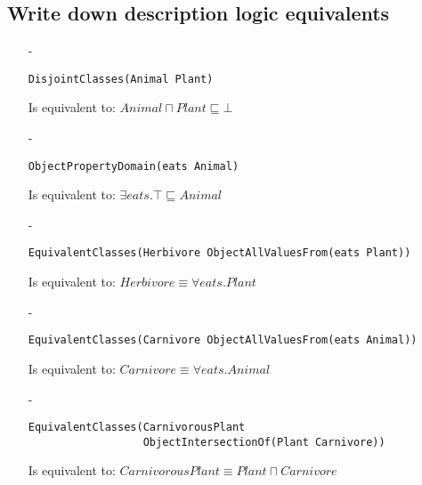 \documentclass[a4paper,12pt]{article}
\begin{document}
\subsection[DL equivalents]{Write down description logic equivalents}
\begin{itemize}
\item[-]\begin{Verbatim}[samepage=true]
DisjointClasses(Animal Plant)
\end{Verbatim}
Is equivalent to: $ Animal \sqcap Plant \sqsubseteq \bot $

\item[-]\begin{Verbatim}[samepage=true]
ObjectPropertyDomain(eats Animal)
\end{Verbatim}
Is equivalent to: $ \exists eats.\top \sqsubseteq Animal $

\item[-]\begin{Verbatim}[samepage=true]
EquivalentClasses(Herbivore ObjectAllValuesFrom(eats Plant))
\end{Verbatim}
Is equivalent to: $ Herbivore \equiv \forall eats.Plant $

\item[-]\begin{Verbatim}[samepage=true]
EquivalentClasses(Carnivore ObjectAllValuesFrom(eats Animal))
\end{Verbatim}
Is equivalent to: $ Carnivore \equiv \forall eats.Animal $

\item[-]\begin{Verbatim}[samepage=true]
EquivalentClasses(CarnivorousPlant 
                  ObjectIntersectionOf(Plant Carnivore))
\end{Verbatim}
Is equivalent to: $ CarnivorousPlant \equiv Plant \sqcap Carnivore $
\end{itemize}
\end{document}
